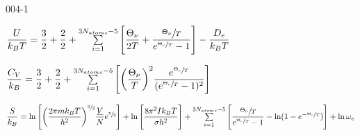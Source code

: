 \begin{mitframe}{004-1}
\begin{listone}
    
    
    \item $\dfrac{\intenergy}{\boltz\Temp}=\dfrac{3}{2}+\dfrac{2}{2}+\sum\limits_{i=1}^{3\nummoles_{atoms}-5}\Bigg[\dfrac{\vibrfreqfac}{2\Temp}+\dfrac{\sfrac{\vibrfreqfac}{\Temp}}{\e^{\sfrac{\vibrfreqfac}{\Temp}}-1}\Bigg]-\dfrac{\eneatom}{\boltz\Temp}$
    
    
    \item $\dfrac{\cv}{\boltz}=\dfrac{3}{2}+\dfrac{2}{2}+\sum\limits_{i=1}^{3\nummoles_{atoms}-5}\Bigg[\bigg(\dfrac{\vibrfreqfac}{\Temp}\bigg)^{2}\dfrac{\e^{\sfrac{\vibrfreqfac}{\Temp}}}{(\e^{\sfrac{\vibrfreqfac}{\Temp}}-1)^{2}}\Bigg]$
           
    
    \item $\dfrac{\entropy}{\boltz}=\ln\Bigg[\bigg(\dfrac{2\pie\mass\boltz\Temp}{\planck^{2}}\bigg)^{\sfrac{3}{2}}\dfrac{\uline{\vol}}{\nummoles}\e^{\sfrac{5}{2}}\Bigg]+\ln\Bigg[\dfrac{8\pie^{2}\mominertia\boltz\Temp}{\molecrad\planck^{2}}\Bigg]+\sum\limits_{i=1}^{3\nummoles_{atoms}-5}\Bigg[\dfrac{\sfrac{\vibrfreqfac}{\Temp}}{\e^{\sfrac{\vibrfreqfac}{\Temp}}-1}-\ln(1-\e^{-\sfrac{\vibrfreqfac}{\Temp}})\Bigg]+\ln\elecdegen$          
    
            

\end{listone}
\end{mitframe}

